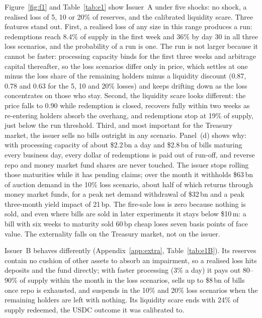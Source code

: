 \begin{table}[tbp]\centering\small
\caption{E1 baseline, Issuer~A: 1{,}000 Monte Carlo paths, 30 business days. Medians across paths unless stated.
``8\% exposure, resolved day~2'' is the calibrated liquidity scare: no processing on day~1, exposure resolved
without loss on day~2.}
\label{tab:e1}
\end{table}

Figure~\ref{fig:f1} and Table~\ref{tab:e1} show Issuer~A under five shocks: no shock, a realised loss of 5, 10 or
20\% of reserves, and the calibrated liquidity scare. Three features stand out. First, a realised loss of any size
in this range produces a run: redemptions reach 8.4\% of supply in the first week and 36\% by day 30 in all three
loss scenarios, and the probability of a run is one. The run is not larger because it cannot be faster:
processing capacity binds for the first three weeks and arbitrage capital thereafter, so the loss scenarios
differ only in price, which settles at one minus the loss share of the remaining holders minus a liquidity
discount (0.87, 0.78 and 0.63 for the 5, 10 and 20\% losses) and keeps drifting down as the loss concentrates on
those who stay. Second, the liquidity scare looks different: the price falls to 0.90 while redemption is closed,
recovers fully within two weeks as re-entering holders absorb the overhang, and redemptions stop at 19\% of
supply, just below the run threshold. Third, and most important for the Treasury market, the issuer sells no bills
outright in any scenario. Panel~(d) shows why: with processing capacity of about \$2.2\,bn a day and \$2.8\,bn of bills
maturing every business day, every dollar of redemptions is paid out of run-off, and reverse repo and money market
fund shares are never touched. The issuer stops rolling those maturities while it has pending claims; over the month it withholds \$63\,bn of auction demand in the 10\% loss scenario, about half of
which returns through money market funds, for a peak net demand withdrawal of \$32\,bn and a peak three-month
yield impact of 21\,bp. The fire-sale loss is zero because nothing is sold, and even where bills are sold in
later experiments it stays below \$10\,m: a bill with six weeks to maturity sold 60\,bp cheap loses seven basis
points of face value. The externality falls on the Treasury market, not on the issuer.

Issuer~B behaves differently (Appendix~\ref{app:extra}, Table~\ref{tab:e1B}). Its reserves contain no cushion of
other assets to absorb an impairment, so a realised loss hits deposits and the fund directly; with faster
processing (3\% a day) it pays out 80--90\% of supply within the month in the loss scenarios, sells up to \$8\,bn
of bills once repo is exhausted, and suspends in the 10\% and 20\% loss scenarios when the remaining holders are
left with nothing. Its liquidity scare ends with 24\% of supply redeemed, the USDC outcome it was calibrated to.

